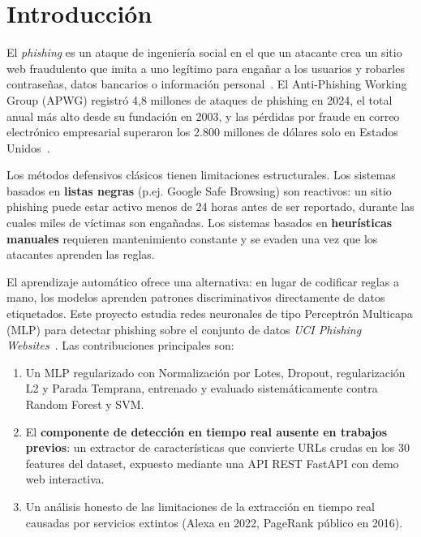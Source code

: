 \documentclass[conference]{IEEEtran}
\begin{document}
\section{Introducción}
El \textit{phishing} es un ataque de ingeniería social en el que un atacante crea un sitio web fraudulento que imita a uno legítimo para engañar a los usuarios y robarles contraseñas, datos bancarios o información personal~\cite{mohammad2012}. El Anti-Phishing Working Group (APWG) registró 4,8 millones de ataques de phishing en 2024, el total anual más alto desde su fundación en 2003, y las pérdidas por fraude en correo electrónico empresarial superaron los 2.800 millones de dólares solo en Estados Unidos~\cite{apwg2024q4}.

Los métodos defensivos clásicos tienen limitaciones estructurales. Los sistemas basados en \textbf{listas negras} (p.ej. Google Safe Browsing) son reactivos: un sitio phishing puede estar activo menos de 24 horas antes de ser reportado, durante las cuales miles de víctimas son engañadas. Los sistemas basados en \textbf{heurísticas manuales} requieren mantenimiento constante y se evaden una vez que los atacantes aprenden las reglas.

El aprendizaje automático ofrece una alternativa: en lugar de codificar reglas a mano, los modelos aprenden patrones discriminativos directamente de datos etiquetados. Este proyecto estudia redes neuronales de tipo Perceptrón Multicapa (MLP) para detectar phishing sobre el conjunto de datos \textit{UCI Phishing Websites}~\cite{uci327}. Las contribuciones principales son:

\begin{enumerate}
  \item Un MLP regularizado con Normalización por Lotes, Dropout, regularización L2 y Parada Temprana, entrenado y evaluado sistemáticamente contra Random Forest y SVM.
  \item El \textbf{componente de detección en tiempo real ausente en trabajos previos}: un extractor de características que convierte URLs crudas en los 30 features del dataset, expuesto mediante una API REST FastAPI con demo web interactiva.
  \item Un análisis honesto de las limitaciones de la extracción en tiempo real causadas por servicios extintos (Alexa en 2022, PageRank público en 2016).
\end{enumerate}
\end{document}
